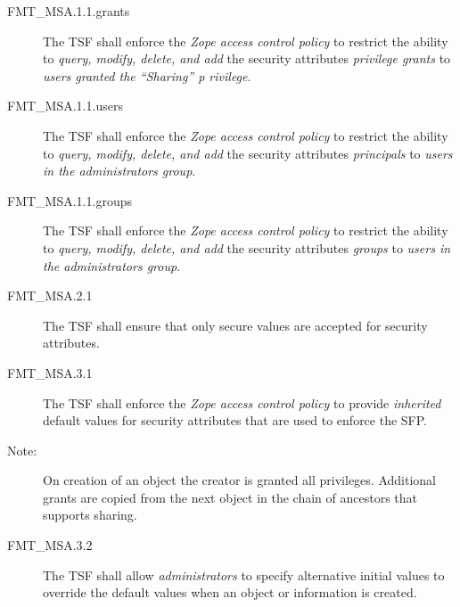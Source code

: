 \documentclass[12pt,english]{scrbook}
\begin{document}




\begin{description}
\item[FMT{\_}MSA.1.1.grants]
    The TSF shall enforce the \emph{Zope access control policy} to restrict the
    ability to \emph{query, modify, delete, and add} the security
    attributes \emph{privilege grants} to \emph{users granted the ``Sharing''
    p
    rivilege}.
\item[FMT{\_}MSA.1.1.users]
    The TSF shall enforce the \emph{Zope access control policy} to restrict the
    ability to \emph{query, modify, delete, and add} the security
    attributes \emph{principals} to \emph{users in the administrators
    group}.

\item[FMT{\_}MSA.1.1.groups]
    The TSF shall enforce the \emph{Zope access control policy} to restrict the
    ability to \emph{query, modify, delete, and add} the security
    attributes \emph{groups} to \emph{users in the administrators group}.

\end{description}


\begin{description}

\item[FMT{\_}MSA.2.1]

    The TSF shall ensure that only secure values are accepted for security
    attributes.
\end{description}




\begin{description}

\item[FMT{\_}MSA.3.1]


The TSF shall enforce the \emph{Zope access control policy} to provide 
\emph{inherited} default values for security attributes that are used to 
enforce the SFP. 

\item[Note:] On creation of an object the creator is granted all privileges.
  Additional grants are copied from the next object in the chain of ancestors
  that supports sharing.

\item[FMT{\_}MSA.3.2 ]

The TSF shall allow \emph{administrators} to specify alternative
initial values to override the default values when an object or
information is created.

\end{description}
\end{document}
